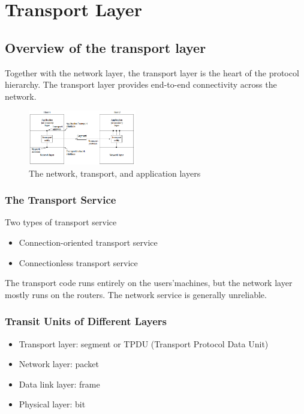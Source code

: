 \newpage
\section{Transport Layer}
\subsection{Overview of the transport layer}
Together with the network layer, the transport layer is the heart of the protocol hierarchy. The transport layer provides end-to-end connectivity across the network. 

\begin{figure}[!htb]
    \centering
    \includegraphics[width=0.42\textwidth]{pic/CN6/The network, transport, and application layers}
    \caption{The network, transport, and application layers}
\end{figure}

\subsubsection{The Transport Service}
Two types of transport service
\begin{itemize}
    \item Connection-oriented transport service
    \item Connectionless transport service
\end{itemize}
The transport code runs entirely on the users'machines, but the network layer mostly runs on the routers. The network service is generally unreliable. 

\subsubsection{Transit Units of Different Layers}
\begin{itemize}
    \item Transport layer: segment or TPDU (Transport Protocol Data Unit)
    \item Network layer: packet
    \item Data link layer: frame
    \item Physical layer: bit
\end{itemize}

